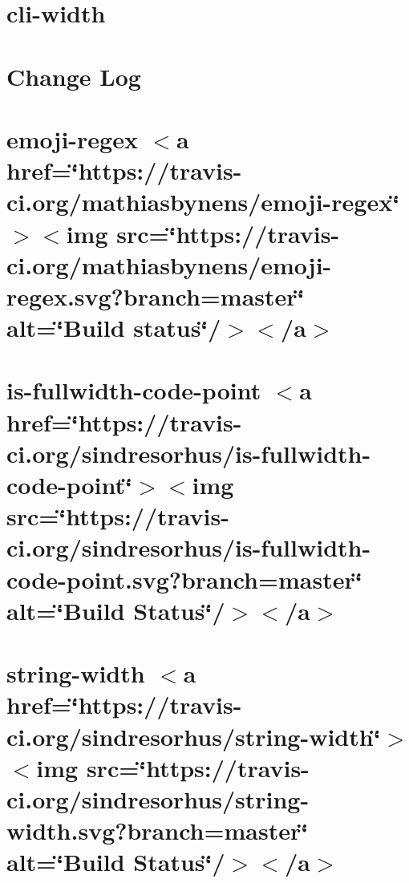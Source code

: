 \let\mypdfximage\pdfximage\def\pdfximage{\immediate\mypdfximage}\documentclass[twoside]{book}
\newcommand{\+}{\discretionary{\mbox{\scriptsize$\hookleftarrow$}}{}{}}
\begin{document}
\chapter{cli-\/width}
\label{md_heap-visualizer_node_modules_cli-width__r_e_a_d_m_e}

\chapter{Change Log}
\label{md_heap-visualizer_node_modules_cliui__c_h_a_n_g_e_l_o_g}

\chapter{emoji-\/regex $<$a href=\char`\"{}https\+://travis-\/ci.\+org/mathiasbynens/emoji-\/regex\char`\"{}$>$$<$img src=\char`\"{}https\+://travis-\/ci.\+org/mathiasbynens/emoji-\/regex.\+svg?branch=master\char`\"{} alt=\char`\"{}\+Build status\char`\"{}/$>$$<$/a$>$}
\label{md_heap-visualizer_node_modules_cliui_node_modules_emoji-regex__r_e_a_d_m_e}

\chapter{is-\/fullwidth-\/code-\/point $<$a href=\char`\"{}https\+://travis-\/ci.\+org/sindresorhus/is-\/fullwidth-\/code-\/point\char`\"{}$>$$<$img src=\char`\"{}https\+://travis-\/ci.\+org/sindresorhus/is-\/fullwidth-\/code-\/point.\+svg?branch=master\char`\"{} alt=\char`\"{}\+Build Status\char`\"{}/$>$$<$/a$>$}
\label{md_heap-visualizer_node_modules_cliui_node_modules_is-fullwidth-code-point_readme}

\chapter{string-\/width $<$a href=\char`\"{}https\+://travis-\/ci.\+org/sindresorhus/string-\/width\char`\"{}$>$$<$img src=\char`\"{}https\+://travis-\/ci.\+org/sindresorhus/string-\/width.\+svg?branch=master\char`\"{} alt=\char`\"{}\+Build Status\char`\"{}/$>$$<$/a$>$}
\label{md_heap-visualizer_node_modules_cliui_node_modules_string-width_readme}

\end{document}
